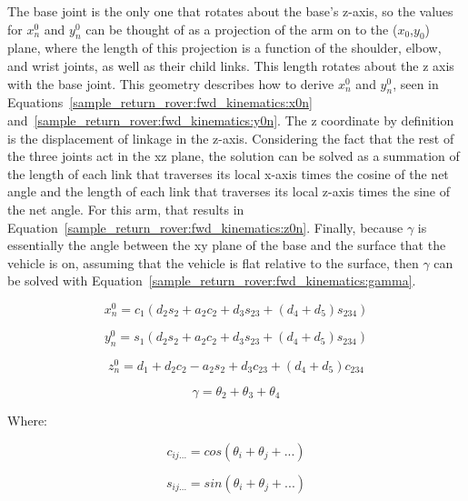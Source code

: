 The base joint is the only one that rotates about the base's z-axis, so the values for $x^{0}_{n}$ and $y^{0}_{n}$ can be thought of as a projection of the arm on to the ($x_{0}$,$y_{0}$) plane, where the length of this projection is a function of the shoulder, elbow, and wrist joints, as well as their child links. This length rotates about the z axis with the base joint. This geometry describes how to derive $x^{0}_{n}$ and $y^{0}_{n}$, seen in Equations~\ref{sample_return_rover:fwd_kinematics:x0n} and~\ref{sample_return_rover:fwd_kinematics:y0n}. The z coordinate by definition is the displacement of linkage in the z-axis. Considering the fact that the rest of the three joints act in the xz plane, the solution can be solved as a summation of the length of each link that traverses its local x-axis times the cosine of the net angle and the length of each link that traverses its local z-axis times the sine of the net angle. For this arm, that results in Equation~\ref{sample_return_rover:fwd_kinematics:z0n}. Finally, because $\gamma$ is essentially the angle between the xy plane of the base and the surface that the vehicle is on, assuming that the vehicle is flat relative to the surface, then $\gamma$ can be solved with Equation~\ref{sample_return_rover:fwd_kinematics:gamma}.

\begin{equation}\label{sample_return_rover:fwd_kinematics:x0n}
	x^{0}_{n} = c_{1}\left(d_{2}s_{2}+a_{2}c_{2}+d_{3}s_{23}+(d_{4}+d_{5})s_{234}\right)
\end{equation}

\begin{equation}\label{sample_return_rover:fwd_kinematics:y0n}
	y^{0}_{n} = s_{1}\left(d_{2}s_{2}+a_{2}c_{2}+d_{3}s_{23}+(d_{4}+d_{5})s_{234}\right)
\end{equation}

\begin{equation}\label{sample_return_rover:fwd_kinematics:z0n}
	z^{0}_{n} = d_{1}+d_{2}c_{2}-a_{2}s_{2}+d_{3}c_{23}+(d_{4}+d_{5})c_{234}
\end{equation}

\begin{equation}\label{sample_return_rover:fwd_kinematics:gamma}
	\gamma = \theta_{2} + \theta_{3} + \theta_{4}
\end{equation}

Where:

\begin{equation}\label{sample_return_rover:fwd_kinematics:cij}
	c_{ij...} = cos(\theta_{i} + \theta_{j} + ...)
\end{equation}

\begin{equation}\label{sample_return_rover:fwd_kinematics:sij}
	s_{ij...} = sin(\theta_{i} + \theta_{j} + ...)
\end{equation}
